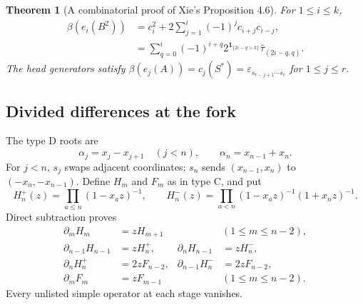 \documentclass[11pt,letterpaper]{article}
\newtheorem{theorem}{Theorem}[section]
\theoremstyle{remark}
\newcommand{\eps}{\varepsilon}
\newcommand{\wtau}{\widehat{\tau}}
\newcommand{\ind}{\mathbf{1}}
\begin{document}
\begin{theorem}[A combinatorial proof of Xie's Proposition 4.6]\label{thm:D}
For $1\leq i\leq k$,
\begin{align}
 \beta(e_i(B^2))
 &=c_i^2+2\sum_{j=1}^{i}(-1)^j c_{i+j}c_{i-j},\label{eq:Dchern}\\
 &=\sum_{q=0}^{i}(-1)^{i+q}
       2^{\ind_{\{2i-q>k\}}}\wtau_{(2i-q,q)}.
 \label{eq:Dtyped}
\end{align}
The head generators satisfy $\beta(e_j(A))=c_j(S^*)=\eps_{s_{r-j+1}\cdots s_r}$ for $1\leq j\leq r$.
\end{theorem}

\subsection{Divided differences at the fork}
The type D roots are
\[
 \alpha_j=x_j-x_{j+1}\quad(j<n),\qquad
 \alpha_n=x_{n-1}+x_n.
\]
For $j<n$, $s_j$ swaps adjacent coordinates; $s_n$ sends $(x_{n-1},x_n)$ to $(-x_n,-x_{n-1})$. Define $H_m$ and $F_m$ as in type C, and put
\[
 H_n^+(z)=\prod_{a\leq n}(1-x_a z)^{-1},\qquad
 H_n^-(z)=\prod_{a<n}(1-x_a z)^{-1}(1+x_n z)^{-1}.
\]
Direct subtraction proves
\begin{align}
 \partial_mH_m&=zH_{m+1} &&(1\leq m\leq n-2),\nonumber\\
 \partial_{n-1}H_{n-1}&=zH_n^+,
 &\partial_nH_{n-1}&=zH_n^-,\nonumber\\
 \partial_nH_n^+&=2zF_{n-2},
 &\partial_{n-1}H_n^-&=2zF_{n-2},\nonumber\\
 \partial_mF_m&=zF_{m-1} &&(1\leq m\leq n-2).
 \label{eq:Dpaths}
\end{align}
Every unlisted simple operator at each stage vanishes.
\end{document}
